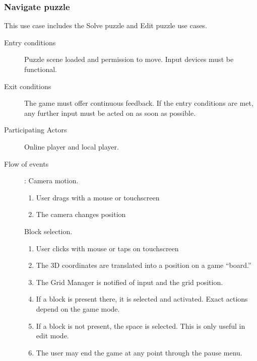 \documentclass[12pt]{article}
\begin{document}
    \subsubsection{Navigate puzzle}
    This use case includes the Solve puzzle and Edit puzzle use cases.
    \begin{description}
        \item[Entry conditions] Puzzle scene loaded and permission to move.
            Input devices must be functional.
        \item[Exit conditions] The game must offer continuous feedback.
            If the entry conditions are met, any further input must be
            acted on as soon as possible.
        \item[Participating Actors] Online player and local player.
        \item[Flow of events]:
            Camera motion.
            \begin{enumerate}
                \item User drags with a mouse or touchscreen
                \item The camera changes position
            \end{enumerate}

            Block selection.
            \begin{enumerate}
                \item User clicks with mouse or taps on touchscreen
                \item The 3D coordinates are translated into a position on
                    a game ``board.''
                \item The Grid Manager is notified of input and the grid
                    position.
                \item If a block is present there, it is selected and activated.
                    Exact actions depend on the game mode.
                \item If a block is not present, the space is selected. This
                    is only useful in edit mode.
                \item The user may end the game at any point through the pause
                    menu.
            \end{enumerate}

    \end{description}


\end{document}
